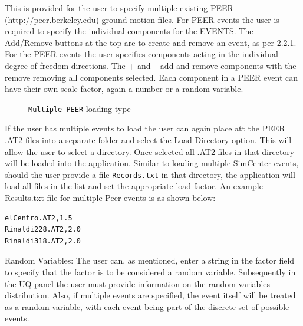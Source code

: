 This is provided for the user to specify multiple existing PEER
(\href{http://peer.berkeley.edu}{http://peer.berkeley.edu}) ground
motion files.  For PEER events the user is required to specify the
individual components for the EVENTS.  The Add/Remove buttons at the
top are to create and remove an event, as per 2.2.1.  For the PEER
events the user specifies components acting in the individual
degree-of-freedom directions.  The + and – add and remove components
with the remove removing all components selected.  Each component in a
PEER event can have their own scale factor, again a number or a random
variable.

\begin{figure}[!htbp]
  \caption{\texttt{Multiple PEER} loading type}
  \label{fig:figure6}
\end{figure}

If the user has multiple events to load the user can again place att the PEER .AT2 files into a separate folder and select the Load Directory option. This will allow the user to select a directory. Once selected all .AT2 files in that directory will be loaded into the application. Similar to loading multiple SimCenter events, should the user provide a file \texttt{Records.txt} in that directory, the application will load all files in the list and set the appropriate load factor. An example Results.txt file for multiple Peer events is as shown below:

\begin{verbatim}
elCentro.AT2,1.5
Rinaldi228.AT2,2.0
Rinaldi318.AT2,2.0
\end{verbatim}

Random Variables: The user can, as mentioned, enter a string in the
factor field to specify that the factor is to be considered a random
variable. Subsequently in the UQ panel the user must provide
information on the random variables distribution. Also, if multiple
events are specified, the event itself will be treated as a random
variable, with each event being part of the discrete set of possible
events.
